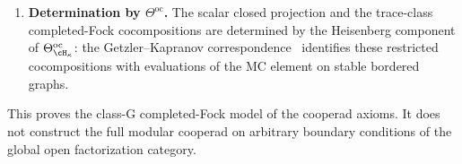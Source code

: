 \begin{theorem}
\begin{enumerate}[label=\textup{(\Roman*)}]
 The obstruction-weighted scalar determinant amplitude is
 \begin{equation}\label{eq:heisenberg-cooperad-partition}
 Z_g^{\mathrm{scal}}(\cH_\kappa;\,\Omega)
 \;=\;
 (\det\operatorname{Im}\Omega)^{-\kappa/2}
 \cdot (\zetareg\Delta_{\Sigma_g})^{-\kappa/2}.
 \end{equation}
 For an actual rank-$d$ level-one free-boson theory this specializes
 to $\kappa=d$; for rank one at arbitrary level it is the scalar
 obstruction lane. The unweighted oscillator character remains the
 rank-one Fock character.
\item \textbf{Determination by $\Theta^{\mathrm{oc}}$.}
 The scalar closed projection and the trace-class completed-Fock
 cocompositions are determined by the Heisenberg component of
 $\Theta^{\mathrm{oc}}_{\cH_\kappa}$: the Getzler--Kapranov
 correspondence~\cite{GeK98} identifies these restricted
 cocompositions with evaluations of the MC element on stable bordered
 graphs.
\end{enumerate}
This proves the class-G completed-Fock model of the cooperad axioms.
It does not construct the full modular cooperad on arbitrary boundary
conditions of the global open factorization category.
\end{theorem}

